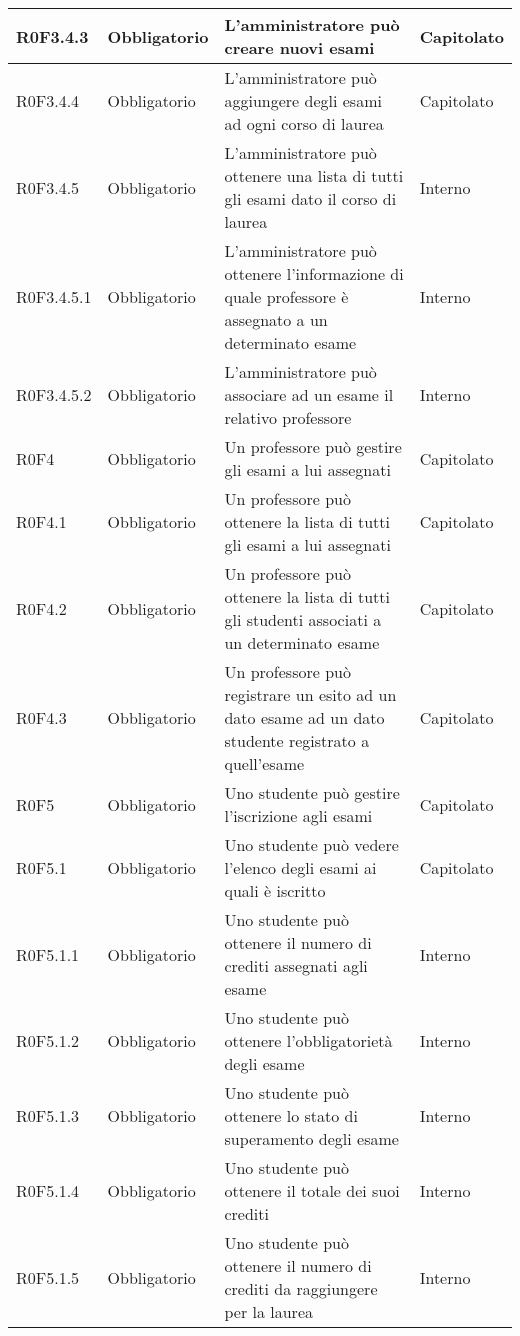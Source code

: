 \documentclass[AnalisiDeiRequisiti.tex]{subfiles}
\begin{document}
\begin{longtable}[H]{|p{2.5cm}|p{2.5cm}|p{5cm}|p{2cm}|}
	R0F3.4.3 & Obbligatorio & L'amministratore può creare nuovi esami & Capitolato \\ \hline
	R0F3.4.4 & Obbligatorio & L'amministratore può aggiungere degli esami ad ogni corso di laurea & Capitolato \\ \hline
	R0F3.4.5 & Obbligatorio & L'amministratore può ottenere una lista di tutti gli esami dato il corso di laurea & Interno \\ \hline
	R0F3.4.5.1 & Obbligatorio & L'amministratore può ottenere l'informazione di quale professore è assegnato a un determinato esame & Interno \\ \hline
	R0F3.4.5.2  & Obbligatorio & L'amministratore può associare ad un esame il relativo professore & Interno \\ \hline
	R0F4 & Obbligatorio & Un professore può gestire gli esami a lui assegnati & Capitolato \\ \hline
	R0F4.1 & Obbligatorio & Un professore può ottenere la lista di tutti gli esami a lui assegnati & Capitolato \\ \hline
	R0F4.2 & Obbligatorio & Un professore può ottenere la lista di tutti gli studenti associati a un determinato esame & Capitolato \\ \hline
	R0F4.3 & Obbligatorio & Un professore può registrare un esito ad un dato esame ad un dato studente registrato a quell'esame & Capitolato \\ \hline
	R0F5 & Obbligatorio & Uno studente può gestire l'iscrizione agli esami & Capitolato \\ \hline
	R0F5.1 & Obbligatorio & Uno studente può vedere l'elenco degli esami ai quali è iscritto & Capitolato \\ \hline
	R0F5.1.1 & Obbligatorio & Uno studente può ottenere il numero di crediti assegnati agli esame & Interno \\ \hline
	R0F5.1.2 & Obbligatorio & Uno studente può ottenere l'obbligatorietà degli esame & Interno \\ \hline
	R0F5.1.3 & Obbligatorio & Uno studente può ottenere lo stato di superamento degli esame & Interno \\ \hline
	R0F5.1.4 & Obbligatorio & Uno studente può ottenere il totale dei suoi crediti & Interno \\ \hline
	R0F5.1.5 & Obbligatorio & Uno studente può ottenere il numero di crediti da raggiungere per la laurea & Interno \\ \hline

\end{longtable}
\end{document}
